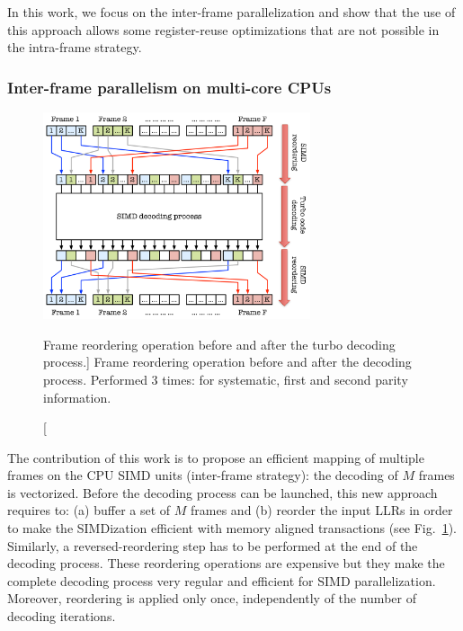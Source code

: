 In this work, we focus on the inter-frame parallelization and show that the use
of this approach allows some register-reuse optimizations that are not possible
in the intra-frame strategy.

\subsubsection{Inter-frame parallelism on multi-core CPUs}

\begin{figure}[htp]
  \centering
  \includegraphics[width=0.70\textwidth]{turbo/reordering_process_inter_simd}
  \caption
    [Frame reordering operation before and after the turbo decoding process.]
    {Frame reordering operation before and after the decoding process. Performed
    3 times: for systematic, first and second parity information.}
  \label{fig:turbo_reordering_process_inter_simd}
\end{figure}

The contribution of this work is to propose an efficient mapping of multiple
frames on the CPU SIMD units (inter-frame strategy): the decoding of $M$ frames
is vectorized. Before the decoding process can be launched, this new approach
requires to: (a) buffer a set of $M$ frames and (b) reorder the input LLRs in
order to make the SIMDization efficient with memory aligned transactions (see
Fig.~\ref{fig:turbo_reordering_process_inter_simd}). Similarly, a
reversed-reordering step has to be performed at the end of the decoding process.
These reordering operations are expensive but they make the complete decoding
process very regular and efficient for SIMD parallelization. Moreover,
reordering is applied only once, independently of the number of decoding
iterations.

